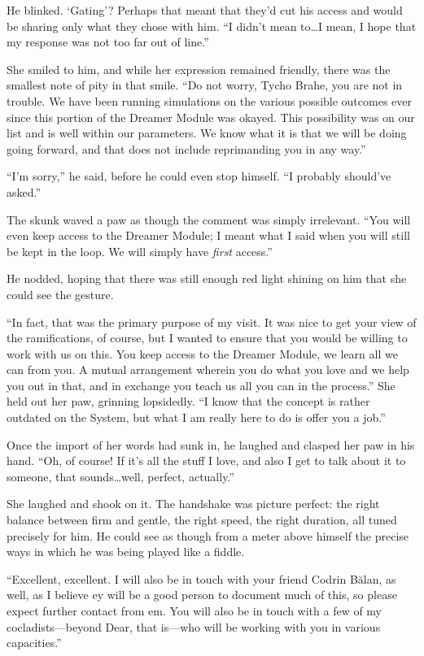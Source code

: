 He blinked. `Gating'? Perhaps that meant that they'd cut his access and would be sharing only what they chose with him. ``I didn't mean to\ldots I mean, I hope that my response was not too far out of line.''

She smiled to him, and while her expression remained friendly, there was the smallest note of pity in that smile. ``Do not worry, Tycho Brahe, you are not in trouble. We have been running simulations on the various possible outcomes ever since this portion of the Dreamer Module was okayed. This possibility was on our list and is well within our parameters. We know what it is that we will be doing going forward, and that does not include reprimanding you in any way.''

``I'm sorry,'' he said, before he could even stop himself. ``I probably should've asked.''

The skunk waved a paw as though the comment was simply irrelevant. ``You will even keep access to the Dreamer Module; I meant what I said when you will still be kept in the loop. We will simply have \emph{first} access.''

He nodded, hoping that there was still enough red light shining on him that she could see the gesture.

``In fact, that was the primary purpose of my visit. It was nice to get your view of the ramifications, of course, but I wanted to ensure that you would be willing to work with us on this. You keep access to the Dreamer Module, we learn all we can from you. A mutual arrangement wherein you do what you love and we help you out in that, and in exchange you teach us all you can in the process.'' She held out her paw, grinning lopsidedly. ``I know that the concept is rather outdated on the System, but what I am really here to do is offer you a job.''

Once the import of her words had sunk in, he laughed and clasped her paw in his hand. ``Oh, of course! If it's all the stuff I love, and also I get to talk about it to someone, that sounds\ldots well, perfect, actually.''

She laughed and shook on it. The handshake was picture perfect: the right balance between firm and gentle, the right speed, the right duration, all tuned precisely for him. He could see as though from a meter above himself the precise ways in which he was being played like a fiddle.

``Excellent, excellent. I will also be in touch with your friend Codrin Bălan, as well, as I believe ey will be a good person to document much of this, so please expect further contact from em. You will also be in touch with a few of my cocladists—beyond Dear, that is—who will be working with you in various capacities.''

